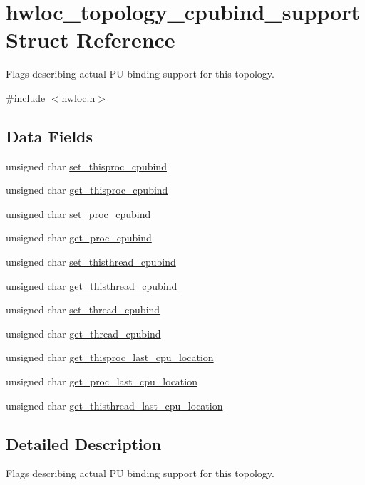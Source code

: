 \hypertarget{a00023}{
\section{hwloc\_\-topology\_\-cpubind\_\-support Struct Reference}
\label{a00023}
}


Flags describing actual PU binding support for this topology.  




{\ttfamily \#include $<$hwloc.h$>$}

\subsection*{Data Fields}
\begin{DoxyCompactItemize}
\item 
unsigned char \hyperlink{a00023_a9403d51657a4d546b3ea9553a2973a27}{set\_\-thisproc\_\-cpubind}
\item 
unsigned char \hyperlink{a00023_a77a09ddd78ee3e9ff5f532a6ac74f7eb}{get\_\-thisproc\_\-cpubind}
\item 
unsigned char \hyperlink{a00023_aa166223d1c2a6de7256ab2d8b675a87e}{set\_\-proc\_\-cpubind}
\item 
unsigned char \hyperlink{a00023_aae705bc447adc163ead377362c4dfe9f}{get\_\-proc\_\-cpubind}
\item 
unsigned char \hyperlink{a00023_a57a89a4b5f1f74fa6cfe176f1e8b0798}{set\_\-thisthread\_\-cpubind}
\item 
unsigned char \hyperlink{a00023_a80d762e532d677dff262d83cc7bb1c60}{get\_\-thisthread\_\-cpubind}
\item 
unsigned char \hyperlink{a00023_a46fba33e307909ce256624687799dd6d}{set\_\-thread\_\-cpubind}
\item 
unsigned char \hyperlink{a00023_a8dd4d8531ed2eebdce1507e7d104154e}{get\_\-thread\_\-cpubind}
\item 
unsigned char \hyperlink{a00023_ad2d5c94b738d92b7d2ede87e4e96321d}{get\_\-thisproc\_\-last\_\-cpu\_\-location}
\item 
unsigned char \hyperlink{a00023_a2554620148b7992a5093f338f5ae254f}{get\_\-proc\_\-last\_\-cpu\_\-location}
\item 
unsigned char \hyperlink{a00023_a6be1f042fdce6bf41b4ea39f6f193808}{get\_\-thisthread\_\-last\_\-cpu\_\-location}
\end{DoxyCompactItemize}


\subsection{Detailed Description}
Flags describing actual PU binding support for this topology. 

